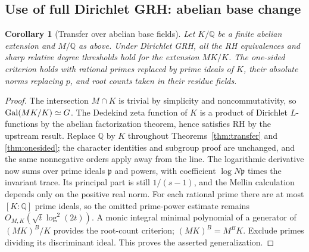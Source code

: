 \documentclass[11pt]{article}
\newtheorem{corollary}[theorem]{Corollary}
\theoremstyle{remark}\newtheorem{remark}[theorem]{Remark}
\newcommand{\Q}{\mathbb Q}\newcommand{\C}{\mathbb C}\newcommand{\F}{\mathbb F}\newcommand{\one}{\mathbf 1}\newcommand{\St}{\mathrm{St}}\newcommand{\Gg}{\Gamma}\newcommand{\PT}{\mathcal P}\newcommand{\eps}{\varepsilon}
\begin{document}
\subsection{Use of full Dirichlet GRH: abelian base change}
\begin{corollary}[Transfer over abelian base fields]
Let $K/\Q$ be a finite abelian extension and $M/\Q$ as above. Under Dirichlet GRH, all the RH equivalences and sharp relative degree thresholds hold for the extension $MK/K$. The one-sided criterion holds with rational primes replaced by prime ideals of $K$, their absolute norms replacing $p$, and root counts taken in their residue fields.
\end{corollary}
\begin{proof}
The intersection $M\cap K$ is trivial by simplicity and noncommutativity, so $\operatorname{Gal}(MK/K)\simeq G$. The Dedekind zeta function of $K$ is a product of Dirichlet $L$-functions by the abelian factorization theorem, hence satisfies RH by the upstream result. Replace $\Q$ by $K$ throughout Theorems~\ref{thm:transfer} and \ref{thm:onesided}; the character identities and subgroup proof are unchanged, and the same nonnegative orders apply away from the line. The logarithmic derivative now sums over prime ideals $\mathfrak p$ and powers, with coefficient $\log N\mathfrak p$ times the invariant trace. Its principal part is still $1/(s-1)$, and the Mellin calculation depends only on the positive real norm. For each rational prime there are at most $[K:\Q]$ prime ideals, so the omitted prime-power estimate remains $O_{M,K}(\sqrt t\log^2(2t))$. A monic integral minimal polynomial of a generator of $(MK)^B/K$ provides the root-count criterion; $(MK)^B=M^BK$. Exclude primes dividing its discriminant ideal. This proves the asserted generalization.
\end{proof}
\end{document}
